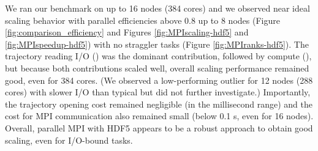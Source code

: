 We ran our benchmark on up to 16 nodes (384 cores) and we observed near ideal scaling behavior with parallel efficiencies above 0.8 up to 8 nodes (Figure \ref{fig:comparison_efficiency} and Figures \ref{fig:MPIscaling-hdf5} and \ref{fig:MPIspeedup-hdf5}) with no straggler tasks (Figure \ref{fig:MPIranks-hdf5}).
The trajectory reading I/O (\tIO) was the dominant contribution, followed by compute (\tcomp), but because both contributions scaled well, overall scaling performance remained good, even for 384 cores.
(We observed a low-performing outlier for 12 nodes (288 cores) with slower I/O than typical but did not further investigate.)
Importantly, the trajectory opening cost remained negligible (in the millisecond range) and the cost for MPI communication also remained small (below 0.1 s, even for 16 nodes).
Overall, parallel MPI with HDF5 appears to be a robust approach to obtain good scaling, even for I/O-bound tasks.

